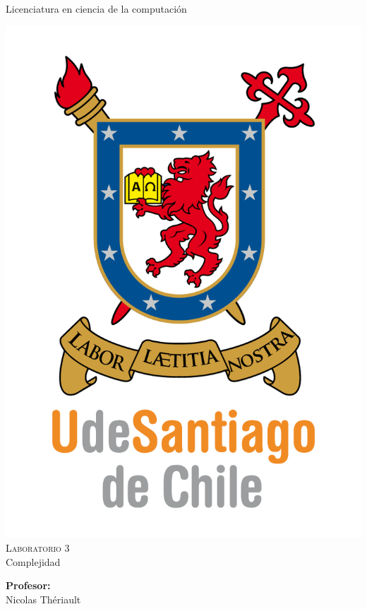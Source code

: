 \documentclass[12pt,letterpaper]{scrartcl}
\author{Don cuyi}
\begin{document}
\begin{titlepage}

\begin{center}

{\Large { Licenciatura en ciencia de la computación} }

\includegraphics[scale=1]{UDSCNRJ}
\\[1cm]

{\Huge \textsc{Laboratorio 3}}\\[0.7cm]

{\huge Complejidad}\\[2cm]


\begin{minipage}[l]{0.4\textwidth}
	\begin{flushleft}
	\linespread{1}
		\textbf{\textsf{Profesor:}}\\
		\large Nicolas Thériault
	\end{flushleft}
\end{minipage}
\begin{minipage}[l]{0.4\textwidth}


\end{minipage}
\end{center}
\end{titlepage}
\end{document}
